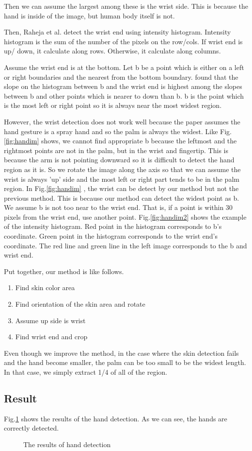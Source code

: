 Then we can assume the largest among these is the wrist side. This is because the hand is inside of the image, but human body itself is not. 

Then, Raheja et al. detect the wrist end using intensity histogram. Intensity histogram is the sum of the number of the pixels on the row/cols. If wrist end is up/ down, it calculate along rows. Otherwise, it calculate along columns.

Assume the wrist end is at the bottom. Let b be a point which is either on a left or right boundaries and the nearest from the bottom boundary.  \cite{ra11} found that the slope on the histogram between b and the wrist end is highest among the slopes between b and other points which is nearer to down than b. b is the point which is the most left or right point so it is always near the most widest region.
\par
However, the wrist detection does not work well because the paper assumes the hand gesture is a  spray hand and so the palm is always the widest. Like Fig.\ref{fig:handim} shows, we cannot find appropriate b because the leftmost and the rightmost points are not in the palm, but in the wrist and fingertip.
This is because the arm is not pointing downward so it is difficult to detect the hand region as it is. 
So we rotate the image along the axis so that we can assume the wrist is always 'up' side and the most left or right part tends to be in the palm region.
In Fig.\ref{fig:handim} , the wrist can be detect by our method but not the previous method. This is because our method can detect the widest point as b. 
We assume b is not too near to the wrist end. That is, if a point is within 30 pixels from the wrist end, use another point.
Fig.\ref{fig:handim2} shows the example of the intensity histogram. Red point in the histogram corresponds to b's coordinate. Green point in the histogram corresponds to the wrist end's coordinate. The red line and green line in the left image corresponds to the b and wrist end.

Put together, our method is like follows.
\begin{enumerate}
  \item Find skin color area
  \item Find orientation of the skin area and rotate
  \item Assume up side is wrist
  \item Find wrist end and crop
\end{enumerate}

Even though we improve the method, in the case where the skin detection fails and the hand become smaller,  the palm can be too small to be the widest length. In that case, we simply extract 1/4 of all of the region.
\subsection{Result}
Fig.\ref{fig:hands} shows the results of the hand detection.
As we can see, the hands are correctly detected.

\begin{landscape}
\begin{figure}[htbp]
 \centering
 
 \caption{The results of hand detection}
 \label{fig:hands}
\end{figure}
\end{landscape}
